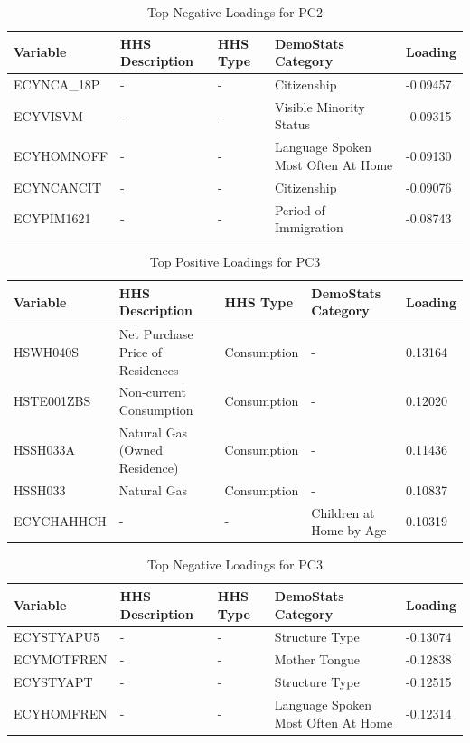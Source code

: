 \documentclass{article}
\begin{document}
\begin{table}[H]
\centering
\caption{Top Negative Loadings for PC2}
\label{tab:pc2_neg}
\begin{tabular}{@{}lllll@{}}
\toprule
Variable & HHS Description & HHS Type & DemoStats Category & Loading \\
\midrule
ECYNCA\_18P & - & - & Citizenship & -0.09457 \\
ECYVISVM & - & - & Visible Minority Status & -0.09315 \\
ECYHOMNOFF & - & - & Language Spoken Most Often At Home & -0.09130 \\
ECYNCANCIT & - & - & Citizenship & -0.09076 \\
ECYPIM1621 & - & - & Period of Immigration & -0.08743 \\
\bottomrule
\end{tabular}
\end{table}

\begin{table}[H]
\centering
\caption{Top Positive Loadings for PC3}
\label{tab:pc3_pos}
\begin{tabular}{@{}lllll@{}}
\toprule
Variable & HHS Description & HHS Type & DemoStats Category & Loading \\
\midrule
HSWH040S & Net Purchase Price of Residences & Consumption & - & 0.13164 \\
HSTE001ZBS & Non-current Consumption & Consumption & - & 0.12020 \\
HSSH033A & Natural Gas (Owned Residence) & Consumption & - & 0.11436 \\
HSSH033 & Natural Gas & Consumption & - & 0.10837 \\
ECYCHAHHCH & - & - & Children at Home by Age & 0.10319 \\
\bottomrule
\end{tabular}
\end{table}

\begin{table}[H]
\centering
\caption{Top Negative Loadings for PC3}
\label{tab:pc3_neg}
\begin{tabular}{@{}lllll@{}}
\toprule
Variable & HHS Description & HHS Type & DemoStats Category & Loading \\
\midrule
ECYSTYAPU5 & - & - & Structure Type & -0.13074 \\
ECYMOTFREN & - & - & Mother Tongue & -0.12838 \\
ECYSTYAPT & - & - & Structure Type & -0.12515 \\
ECYHOMFREN & - & - & Language Spoken Most Often At Home & -0.12314 \\
\bottomrule
\end{tabular}
\end{table}
\end{document}
